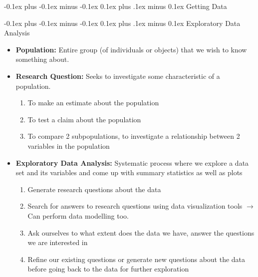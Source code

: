 \documentclass[landscape]{article}
\makeatletter
\renewcommand{\section}{\@startsection{section}{1}{0mm}%
  {-0.1ex plus -0.1ex minus -0.1ex}%
  {0.1ex plus .1ex minus 0.1ex}%
{\normalfont\small\bfseries}}
\renewcommand{\subsection}{\@startsection{subsection}{2}{0mm}%
  {-0.1ex plus -0.1ex minus -0.1ex}%
  {0.1ex plus .1ex minus 0.1ex}%
{\normalfont\scriptsize\bfseries}}
\makeatother
\begin{document}
\raggedright
\tiny
\begin{multicols*}{5}
    \setlength{\columnseprule}{0.25pt}

    \begin{tightcenter}
    \end{tightcenter}
    
    \section{Getting Data}

    \subsection{Exploratory Data Analysis}

      \begin{itemize}
        \item \textbf{Population:} Entire group (of individuals or objects) that we wish to know something about.
        \item \textbf{Research Question:} Seeks to investigate some characteristic of a population.
        \begin{enumerate}
          \item To make an estimate about the population
          \item To test a claim about the population
          \item To compare 2 subpopulations, to investigate a relationship between 2 variables in the population
        \end{enumerate}
        \item \textbf{Exploratory Data Analysis:} Systematic process where we explore a data set and its variables and come up with summary statistics as well as plots
        \begin{enumerate}
          \item Generate research questions about the data
          \item Search for answers to research questions using data visualization tools $\rightarrow$ Can perform data modelling too.
          \item Ask ourselves to what extent does the data we have, answer the questions we are interested in
          \item Refine our existing questions or generate new questions about the data before going back to the data for further exploration
        \end{enumerate}
      \end{itemize}
    

\end{multicols*}
\end{document}
